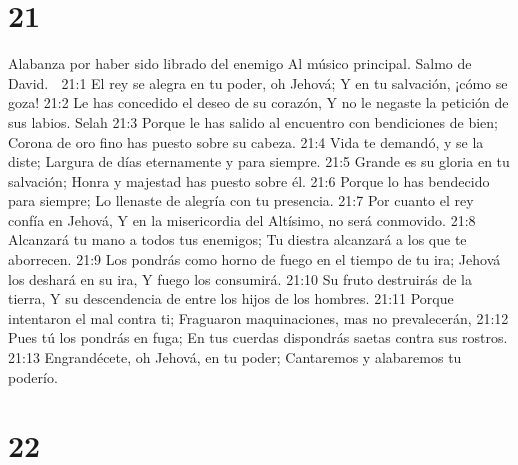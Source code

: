 \chapter{21}

Alabanza por haber sido librado del enemigo 
Al músico principal. Salmo de David. 

21:1 El rey se alegra en tu poder, oh Jehová; 
Y en tu salvación, ¡cómo se goza! 
21:2 Le has concedido el deseo de su corazón, 
Y no le negaste la petición de sus labios. Selah 
21:3 Porque le has salido al encuentro con bendiciones de bien; 
Corona de oro fino has puesto sobre su cabeza. 
21:4 Vida te demandó, y se la diste; 
Largura de días eternamente y para siempre. 
21:5 Grande es su gloria en tu salvación; 
Honra y majestad has puesto sobre él. 
21:6 Porque lo has bendecido para siempre; 
Lo llenaste de alegría con tu presencia. 
21:7 Por cuanto el rey confía en Jehová, 
Y en la misericordia del Altísimo, no será conmovido. 
21:8 Alcanzará tu mano a todos tus enemigos; 
Tu diestra alcanzará a los que te aborrecen. 
21:9 Los pondrás como horno de fuego en el tiempo de tu ira; 
Jehová los deshará en su ira, 
Y fuego los consumirá. 
21:10 Su fruto destruirás de la tierra, 
Y su descendencia de entre los hijos de los hombres. 
21:11 Porque intentaron el mal contra ti; 
Fraguaron maquinaciones, mas no prevalecerán, 
21:12 Pues tú los pondrás en fuga; 
En tus cuerdas dispondrás saetas contra sus rostros. 
21:13 Engrandécete, oh Jehová, en tu poder; 
Cantaremos y alabaremos tu poderío. 

\chapter{22}

